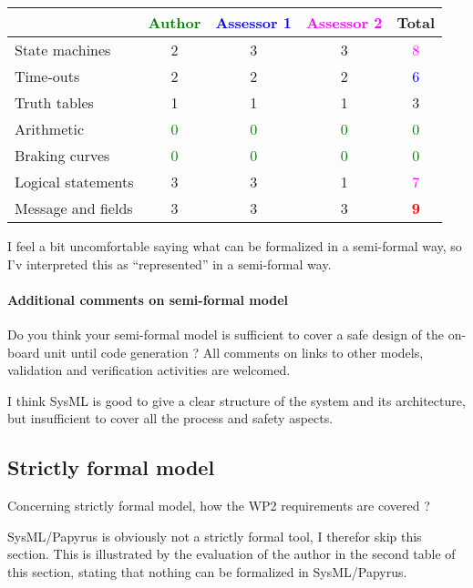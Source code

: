 \begin{tabular}{|l | c | c | c | c|}
\hline
& \textcolor{green}{Author} & \textcolor{blue}{Assessor 1} & \textcolor{magenta}{Assessor 2} & Total \\
\hline
State machines & 2    & 3    & 3    & \textcolor{magenta}{8} \\
\hline
Time-outs & 2    & 2    & 2    & \textcolor{blue}{6} \\
\hline
Truth tables & 1    & 1    & 1    & 3    \\
\hline
Arithmetic & \textcolor{green}{0} & \textcolor{green}{0} & \textcolor{green}{0} & \textcolor{green}{0} \\
\hline
Braking curves & \textcolor{green}{0} & \textcolor{green}{0} & \textcolor{green}{0} & \textcolor{green}{0} \\
\hline
Logical statements & 3    & 3    & 1    & \textcolor{magenta}{7} \\
\hline
Message and fields & 3    & 3    & 3    & \textcolor{red}{\textbf{9}} \\
\hline
\end{tabular}

\begin{assessor1}
I feel a bit uncomfortable saying what can be formalized in a semi-formal way, so I'v interpreted this as "`represented"' in a semi-formal way. 
\end{assessor1}

\paragraph{Additional comments on semi-formal model} Do you think your semi-formal model is sufficient to cover a safe design of the on-board unit until code generation ?
All comments on links to other models, validation and verification activities are welcomed.


\begin{assessor2}
I think SysML is good to give a clear structure of the system and its architecture, but insufficient to cover all the process and safety aspects.
\end{assessor2}

\subsection{Strictly formal model}

Concerning strictly formal model, how the WP2 requirements are covered ?

\begin{assessor1}
SysML/Papyrus is obviously not a strictly formal tool, I therefor skip this section. 
This is illustrated by the evaluation of the author in the second table of this section, stating that nothing can be formalized in SysML/Papyrus. 
\end{assessor1}


